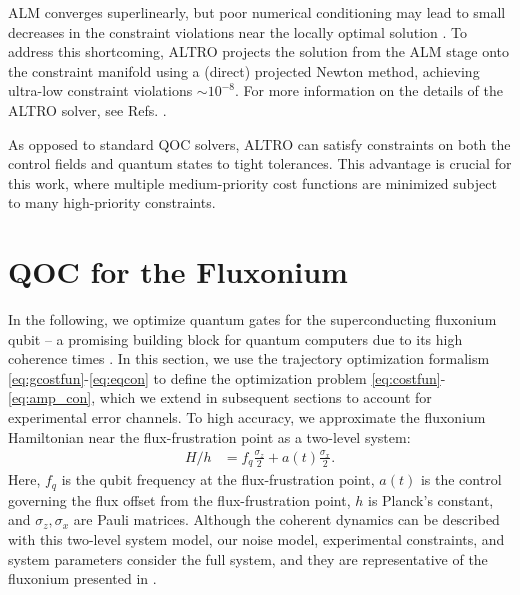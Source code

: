 \documentclass[
  amsfonts,
  amsmath,
  amssymb,
  pra,
  twocolumn,
  superscriptaddress,
]{revtex4-2}
\begin{document}
ALM converges superlinearly, but poor numerical conditioning may lead
to small decreases in the constraint violations near the locally optimal solution
\cite{bertsekas2014constrained}.
To address this shortcoming, ALTRO
projects the solution from the ALM stage onto the constraint manifold using
a (direct) projected Newton method, achieving ultra-low
constraint violations $\sim 10^{-8}$.
For more information on the details of the ALTRO
solver, see Refs. \cite{howell2019altro, Jackson2020altroc}.

As opposed to standard QOC solvers, ALTRO
can satisfy constraints on both the control fields and quantum states to tight tolerances.
This advantage is crucial for this work, where multiple medium-priority cost functions
are minimized subject to many high-priority constraints.

\section{QOC for the Fluxonium \label{sec:fluxonium}}
In the following, we optimize quantum gates
for the superconducting fluxonium qubit -- a promising
building block for quantum computers due to its high
coherence times
\cite{earnest2018realization, lin2018demonstration,
  manucharyan2009fluxonium, somoroff2021millisecond, nguyen2019high,
  zhang2020universal}.
In this section, we use the trajectory optimization
formalism \eqref{eq:gcostfun}-\eqref{eq:eqcon}
to define the optimization problem \eqref{eq:costfun}-\eqref{eq:amp_con},
which we extend in subsequent sections to account
for experimental error channels.
To high accuracy, we approximate the fluxonium Hamiltonian near the flux-frustration
point as a two-level system:
\begin{align}
  H/h &= f_{q} \frac{\sigma_{z}}{2} + a(t) \frac{\sigma_{x}}{2}.
  \label{eq:hamiltonian}
\end{align}
Here, $f_{q}$ is the qubit frequency at the flux-frustration point,
$a(t)$ is the control governing the flux offset from the flux-frustration point,
$h$ is Planck's constant, and $\sigma_{z}, \sigma_{x}$
are Pauli matrices. Although the coherent dynamics can be described with this two-level
system model, our noise model, experimental constraints, and system parameters
consider the full system, and they are representative of the fluxonium
presented in \cite{zhang2020universal}.
\end{document}
